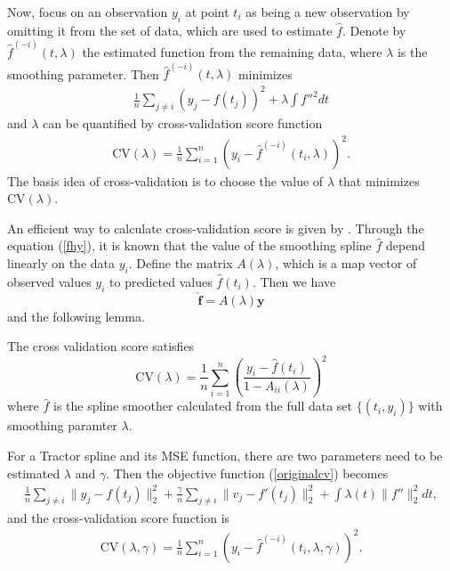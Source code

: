 Now, focus on an observation $y_i$ at point $t_i$ as being a new observation by omitting it from the set of data, which are used to estimate $\hat{f}$. Denote by $\hat{f}^{(-i)}(t,\lambda)$ the estimated function from the remaining data, where $\lambda$ is the smoothing parameter. Then $\hat{f}^{(-i)}(t,\lambda)$ minimizes 
\begin{align}\label{originalcv}
\frac{1}{n}\sum_{j \neq i}(y_j-f(t_j))^2+\lambda \int f''^2dt
\end{align}
 and $\lambda$ can be quantified by cross-validation score function
\begin{align}
\mbox{CV}(\lambda)=\frac{1}{n}\sum_{i=1}^{n}\left(  y_i-\hat{f}^{(-i)}(t_i,\lambda)\right) ^2.
\end{align}
The basis idea of cross-validation is to choose the value of $\lambda$ that minimizes $\mbox{CV}(\lambda)$. 

An efficient way to calculate cross-validation score is given by \cite{green1993nonparametric}. Through the equation (\ref{fhy}), it is known that the value of the smoothing spline $\hat{f}$ depend linearly on the data $y_i$. Define the matrix $A(\lambda)$, which is a map vector of observed values $y_i$ to predicted values $\hat{f}(t_i)$. Then we have
\begin{equation}\label{crossvalidationmatrixA}
\hat{\mathbf{f}}=A(\lambda)\mathbf{y}
\end{equation}
and the following lemma.
\begin{lemma}\label{cvlema}
The cross validation score satisfies
\begin{equation}
\mbox{CV}(\lambda)=\frac{1}{n} \sum_{i=1}^n \left(\frac{y_i-\hat{f}(t_i)}{1-A_{ii}(\lambda)}\right)^2
\end{equation}
where $\hat{f}$ is the spline smoother calculated from the full data set $\{(t_i,y_i)\}$ with smoothing paramter $\lambda$.
\end{lemma}

For a Tractor spline and its MSE function, there are two parameters need to be estimated $\lambda$ and $\gamma$. Then the objective function (\ref{originalcv}) becomes
\begin{align}
\frac{1}{n}\sum_{j \neq i}\lVert y_j-f(t_j) \rVert_2^2+\frac{\gamma}{n}\sum_{j \neq i} \lVert v_j-f'(t_j) \rVert_2^2+ \int \lambda(t) \lVert f''\rVert_2^2dt,
\end{align}
and the cross-validation score function is
\begin{align}
\mbox{CV}(\lambda,\gamma)=\frac{1}{n}\sum_{i=1}^{n}\left( y_i-\hat{f}^{(-i)}(t_i,\lambda,\gamma) \right) ^2.
\end{align}

